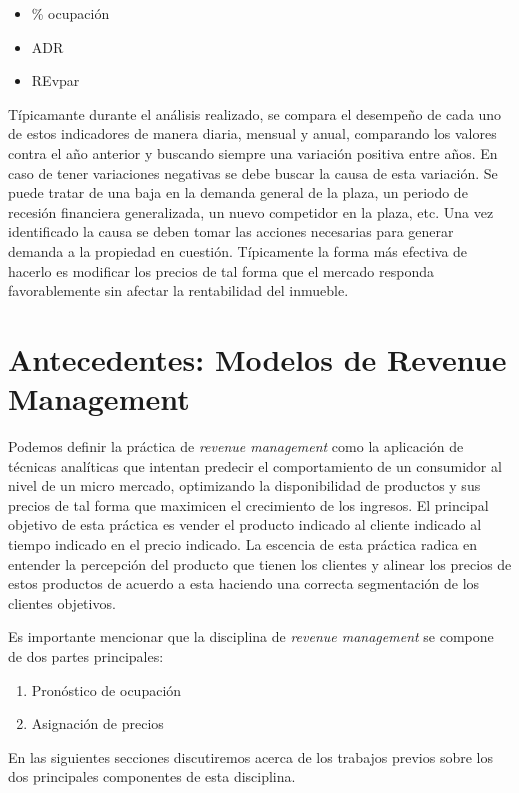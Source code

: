 {\begin{itemize}
  \item \% ocupación
  \item ADR
  \item REvpar
\end{itemize}

Típicamante durante el análisis realizado, se compara el desempeño de cada uno de estos indicadores de manera diaria, mensual y anual, comparando los valores contra el año anterior y buscando siempre una variación positiva entre años. En caso de tener variaciones negativas se debe buscar la causa de esta variación. Se puede tratar de una baja en la demanda general de la plaza, un periodo de recesión financiera generalizada, un nuevo competidor en la plaza, etc. Una vez identificado la causa se deben tomar las acciones necesarias para generar demanda a la propiedad en cuestión. Típicamente la forma más efectiva de hacerlo es modificar los precios de tal forma que el mercado responda favorablemente sin afectar la rentabilidad del inmueble.

\section*{Antecedentes: Modelos de Revenue Management}

Podemos definir la práctica de \emph{revenue management} como la aplicación de técnicas analíticas que intentan predecir el comportamiento de un consumidor al nivel de un micro mercado, optimizando la disponibilidad de productos y sus precios de tal forma que maximicen el crecimiento de los ingresos. El principal objetivo de esta práctica es vender el producto indicado al cliente indicado al tiempo indicado en el precio indicado. La escencia de esta práctica radica en entender la percepción del producto que tienen los clientes y alinear los precios de estos productos de acuerdo a esta haciendo una correcta segmentación de los clientes objetivos.

Es importante mencionar que la disciplina de \emph{revenue management} se compone de dos partes principales:
\begin{enumerate}
  \item Pronóstico de ocupación
  \item Asignación de precios
\end{enumerate}

En las siguientes secciones discutiremos acerca de los trabajos previos sobre los dos principales componentes de esta disciplina.

}
